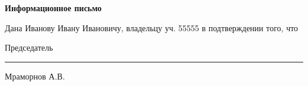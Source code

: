
\vspace{10mm}
\begin{center}
	\Large\textbf{Информационное письмо}
\end{center}
\par

Дана Иванову Ивану Ивановичу, владельцу уч. 55555 в подтверждении того, что 

\vspace{35mm}
Председатель \hfill    \rule{4cm}{0.1 mm}    Мраморнов А.В.




